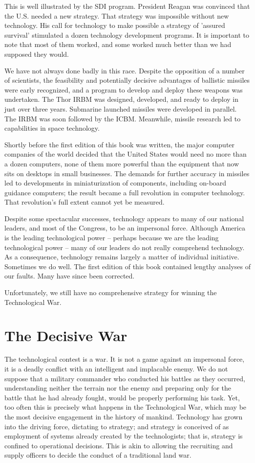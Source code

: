 \documentclass[a4paper,12pt]{book}
\begin{document}
This is well illustrated by the SDI program. President Reagan was convinced that the U.S. needed a new strategy. That strategy was impossible without new technology. His call for technology to make possible a strategy of 'assured survival' stimulated a dozen technology development programs. It is important to note that most of them worked, and some worked much better than we had supposed they would.

We have not always done badly in this race. Despite the opposition of a number of scientists, the feasibility and potentially decisive advantages of ballistic missiles were early recognized, and a program to develop and deploy these weapons was undertaken. The Thor IRBM was designed, developed, and ready to deploy in just over three years. Submarine launched missiles were developed in parallel. The IRBM was soon followed by the ICBM. Meanwhile, missile research led to capabilities in space technology.

Shortly before the first edition of this book was written, the major computer companies of the world decided that the United States would need no more than a dozen computers, none of them more powerful than the equipment that now sits on desktops in small businesses. The demands for further accuracy in missiles led to developments in miniaturization of components, including on-board guidance computers; the result became a full revolution in computer technology. That revolution's full extent cannot yet be measured.

Despite some spectacular successes, technology appears to many of our national leaders, and most of the Congress, to be an impersonal force. Although America is the leading technological power -- perhaps because we are the leading technological power -- many of our leaders do not really comprehend technology. As a consequence, technology remains largely a matter of individual initiative. Sometimes we do well. The first edition of this book contained lengthy analyses of our faults. Many have since been corrected.

Unfortunately, we still have no comprehensive strategy for winning the Technological War.

\section{The Decisive War}
The technological contest is a war. It is not a game against an impersonal force, it is a deadly conflict with an intelligent and implacable enemy. We do not suppose that a military commander who conducted his battles as they occurred, understanding neither the terrain nor the enemy and preparing only for the battle that he had already fought, would be properly performing his task. Yet, too often this is precisely what happens in the Technological War, which may be the most decisive engagement in the history of mankind. Technology has grown into the driving force, dictating to strategy; and strategy is conceived of as employment of systems already created by the technologists; that is, strategy is confined to operational decisions. This is akin to allowing the recruiting and supply officers to decide the conduct of a traditional land war.
\end{document}

